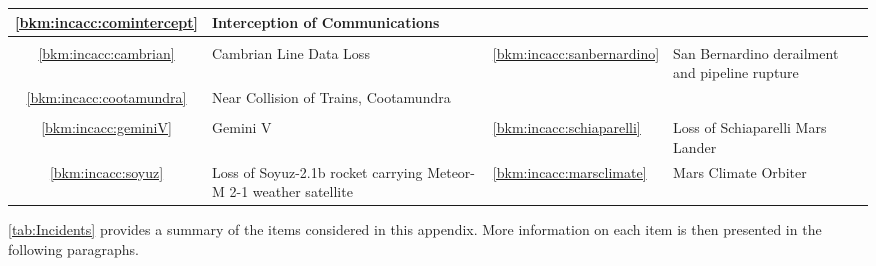 \begin{longtable}{|C{}|L{}|L{}|L{}|}
    \ref{bkm:incacc:comintercept} & Interception of Communications & &\\
    \hline
    \\\hline
    \ref{bkm:incacc:cambrian} & Cambrian Line Data Loss &
    \ref{bkm:incacc:sanbernardino} &
    San Bernardino derailment and pipeline rupture\\
    \ref{bkm:incacc:cootamundra} & Near Collision of Trains, Cootamundra & &\\
    \hline
    \\\hline
    \ref{bkm:incacc:geminiV} & Gemini V &
    \ref{bkm:incacc:schiaparelli} & Loss of Schiaparelli Mars Lander\\
    \ref{bkm:incacc:soyuz} & Loss of Soyuz-2.1b rocket carrying Meteor-M 2-1 weather satellite &
    \ref{bkm:incacc:marsclimate} & Mars Climate Orbiter\\
    \hline
\end{longtable}
%
%
%
\autoref{tab:Incidents} provides a summary of the items considered in this appendix. More information on each item is then presented in the following paragraphs.

